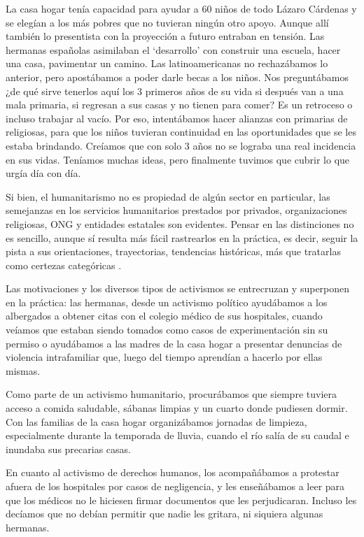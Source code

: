 \documentclass[
  spanish,
  11pt,
  a4paper,
]{scrbook}
\begin{document}
La casa hogar tenía capacidad para ayudar a 60 niños de todo Lázaro
Cárdenas y se elegían a los más pobres que no tuvieran ningún otro
apoyo. Aunque allí también lo presentista con la proyección a futuro
entraban en tensión. Las hermanas españolas asimilaban el `desarrollo'
con construir una escuela, hacer una casa, pavimentar un camino. Las
latinoamericanas no rechazábamos lo anterior, pero apostábamos a poder
darle becas a los niños. Nos preguntábamos ¿de qué sirve tenerlos aquí
los 3 primeros años de su vida si después van a una mala primaria, si
regresan a sus casas y no tienen para comer? Es un retroceso o incluso
trabajar al vacío. Por eso, intentábamos hacer alianzas con primarias de
religiosas, para que los niños tuvieran continuidad en las oportunidades
que se les estaba brindando. Creíamos que con solo 3 años no se lograba
una real incidencia en sus vidas. Teníamos muchas ideas, pero finalmente
tuvimos que cubrir lo que urgía día con día.

Si bien, el humanitarismo no es propiedad de algún sector en particular,
las semejanzas en los servicios humanitarios prestados por privados,
organizaciones religiosas, ONG y entidades estatales son evidentes.
Pensar en las distinciones no es sencillo, aunque sí resulta más fácil
rastrearlos en la práctica, es decir, seguir la pista a sus
orientaciones, trayectorias, tendencias históricas, más que tratarlas
como certezas categóricas \autocite[7]{Redfield2011}.

Las motivaciones y los diversos tipos de activismos se entrecruzan y
superponen en la práctica: las hermanas, desde un activismo político
ayudábamos a los albergados a obtener citas con el colegio médico de sus
hospitales, cuando veíamos que estaban siendo tomados como casos de
experimentación sin su permiso o ayudábamos a las madres de la casa
hogar a presentar denuncias de violencia intrafamiliar que, luego del
tiempo aprendían a hacerlo por ellas mismas.

Como parte de un activismo humanitario, procurábamos que siempre tuviera
acceso a comida saludable, sábanas limpias y un cuarto donde pudiesen
dormir. Con las familias de la casa hogar organizábamos jornadas de
limpieza, especialmente durante la temporada de lluvia, cuando el río
salía de su caudal e inundaba sus precarias casas.

En cuanto al activismo de derechos humanos, los acompañábamos a
protestar afuera de los hospitales por casos de negligencia, y les
enseñábamos a leer para que los médicos no le hiciesen firmar documentos
que les perjudicaran. Incluso les decíamos que no debían permitir que
nadie les gritara, ni siquiera algunas hermanas.
\end{document}
